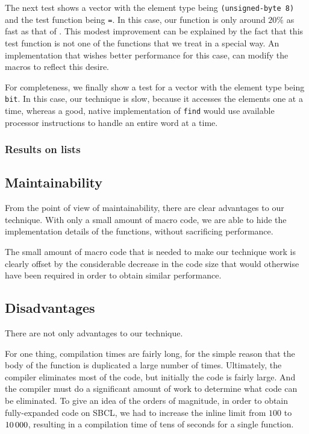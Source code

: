 
The next test shows a vector with the element type being
\texttt{(unsigned-byte 8)} and the test function being \texttt{=}.  In
this case, our function is only around $20\%$ as fast as that of
\sbcl{}.  This modest improvement can be explained by the fact that
this test function is not one of the functions that we treat in a
special way.  An implementation that wishes better performance for
this case, can modify the macros to reflect this desire.


For completeness, we finally show a test for a vector with the element
type being \texttt{bit}.  In this case, our technique is slow, because
it accesses the elements one at a time, whereas a good, native
implementation of \texttt{find} would use available processor
instructions to handle an entire word at a time.


\subsubsection{Results on lists}

\subsection{Maintainability}

From the point of view of maintainability, there are clear advantages
to our technique.  With only a small amount of macro code, we are able
to hide the implementation details of the functions, without
sacrificing performance.

The small amount of macro code that is needed to make our technique
work is clearly offset by the considerable decrease in the code size
that would otherwise have been required in order to obtain similar
performance.

\subsection{Disadvantages}

There are not only advantages to our technique.

For one thing, compilation times are fairly long, for the simple
reason that the body of the function is duplicated a large number of
times.  Ultimately, the compiler eliminates most of the code, but
initially the code is fairly large.  And the compiler must do a
significant amount of work to determine what code can be eliminated.
To give an idea of the orders of magnitude, in order to obtain
fully-expanded code on SBCL, we had to increase the inline limit from
$100$ to $10\thinspace000$, resulting in a compilation time of tens of
seconds for a single function.

